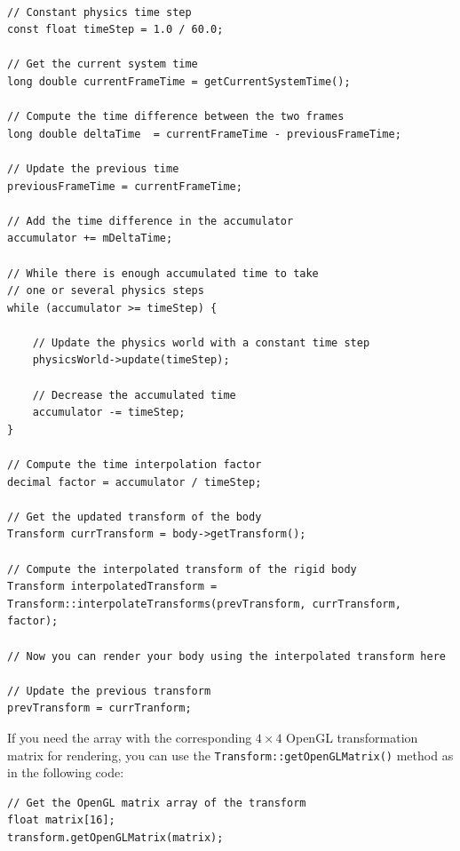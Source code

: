 \documentclass[a4paper,12pt]{article}
\begin{document}
    \begin{lstlisting}

// Constant physics time step
const float timeStep = 1.0 / 60.0;

// Get the current system time
long double currentFrameTime = getCurrentSystemTime();

// Compute the time difference between the two frames
long double deltaTime  = currentFrameTime - previousFrameTime;

// Update the previous time
previousFrameTime = currentFrameTime;

// Add the time difference in the accumulator
accumulator += mDeltaTime;

// While there is enough accumulated time to take
// one or several physics steps
while (accumulator >= timeStep) {

    // Update the physics world with a constant time step
    physicsWorld->update(timeStep);

    // Decrease the accumulated time
    accumulator -= timeStep;
}

// Compute the time interpolation factor
decimal factor = accumulator / timeStep;

// Get the updated transform of the body
Transform currTransform = body->getTransform();

// Compute the interpolated transform of the rigid body
Transform interpolatedTransform = Transform::interpolateTransforms(prevTransform, currTransform, factor);

// Now you can render your body using the interpolated transform here

// Update the previous transform
prevTransform = currTranform;

    \end{lstlisting}

    \vspace{0.6cm}

    If you need the array with the corresponding $4 \times 4$ OpenGL transformation matrix for rendering, you can use
    the \texttt{Transform::getOpenGLMatrix()} method as in the following code: \\

    \begin{lstlisting}
// Get the OpenGL matrix array of the transform
float matrix[16];
transform.getOpenGLMatrix(matrix);
  \end{lstlisting}

    \vspace{0.6cm}
\end{document}
